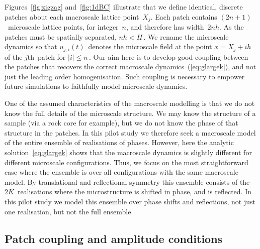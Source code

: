 \documentclass[12pt,a4paper]{article}
\begin{document}
Figures~\ref{fig:zigzag} and~\ref{fig:1dBC} illustrate that we define identical, discrete patches about each macroscale lattice point~$X_j$. Each patch contains $(2n + 1)$~microscale lattice points, for integer~$n$, and therefore has width~$2nh$. As the patches must be spatially separated, $nh < H$\,.  We rename the microscale dynamics so that $u_{j,i}(t)$~denotes the microscale field at the point $x=X_j+ih$ of the $j$th~patch for $|i|\leq n$\,.  Our aim here is to develop good coupling between the patches that recovers the correct macroscale dynamics~(\ref{eq:glargek}), and not just the leading order homogenisation.  Such coupling is necessary to empower future simulations to faithfully model microscale dynamics.

One of the assumed characteristics of the macroscale modelling is that we do not know the full details of the microscale structure.  We may know the structure of a sample (via a rock core for example), but we do not know the phase of that structure in the patches.  In this pilot study we therefore seek a macroscale model of the entire ensemble of realisations of phases.  However, here the analytic solution~\eqref{eq:glargek} shows that the macroscale dynamics is slightly different for different microscale configurations.  Thus, we focus on the most straightforward case where the ensemble is over all configurations with the same macroscale model.  By translational and reflectional symmetry this ensemble consists of the $2K$~realisations where the microstructure is shifted in phase, and is reflected.   In this pilot study we model this ensemble over phase shifts and reflections, not just one realisation, but not the full ensemble.


\subsection{Patch coupling and amplitude conditions}
\label{sec:BC}
\end{document}
